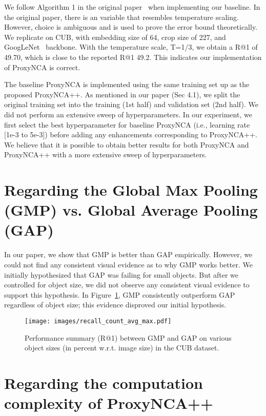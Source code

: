 \documentclass[runningheads]{llncs}
\begin{document}
We follow Algorithm 1 in the original paper~\cite{movshovitz2017no} when implementing our baseline.
In the original paper, there is an  variable that resembles temperature scaling. However,  choice is ambiguous and is used to prove the error bound theoretically. We replicate \cite{movshovitz2017no} on CUB, with embedding size of 64, crop size of 227, and GoogLeNet~\cite{I1} backbone. With the temperature scale, T=1/3, we obtain a R@1 of 49.70, which is close to the reported R@1 49.2. This indicates our implementation of ProxyNCA is correct.

The baseline ProxyNCA is implemented using the same training set up as the proposed ProxyNCA++. As mentioned in our paper (Sec 4.1), we split the original training set into the training (1st half) and validation set (2nd half). We did not perform an extensive sweep of hyperparameters. In our experiment, we first select the best hyperparameter for baseline ProxyNCA (i.e., learning rate [1e-3 to 5e-3]) before adding any enhancements corresponding to ProxyNCA++. We believe that it is possible to obtain better results for both ProxyNCA and ProxyNCA++ with a more extensive sweep of hyperparameters.

\section{Regarding the Global Max Pooling (GMP) vs. Global Average Pooling (GAP)}

In our paper, we show that GMP is better than GAP empirically. However, we could not find any consistent visual evidence as to why GMP works better. We initially hypothesized that GAP was failing for small objects. But after we controlled for object size, we did not observe any consistent visual evidence to support this hypothesis. In Figure~\ref{fig:gmp_gap_cub}, GMP consistently outperform GAP regardless of object size; this evidence disproved our initial hypothesis.  

\begin{figure}
  \centering
  \caption{Performance summary (R@1) between GMP and GAP on various object sizes (in percent w.r.t. image size) in the CUB dataset.}
\texttt{[image: images/recall\_count\_avg\_max.pdf]}
  \label{fig:gmp_gap_cub}
\end{figure}
\newpage
\section{Regarding the computation complexity of ProxyNCA++}
\end{document}
